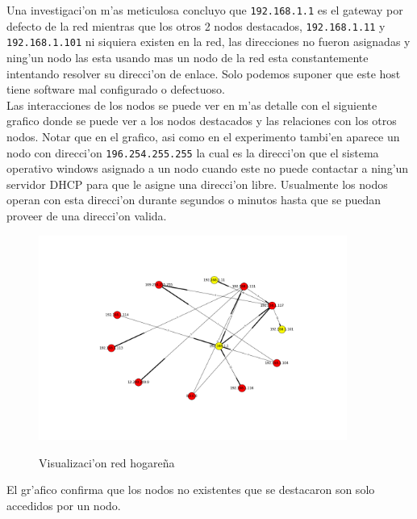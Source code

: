 Una investigaci'on m'as meticulosa concluyo que \texttt{192.168.1.1} es el gateway por defecto de la red mientras que los otros 2 nodos
destacados, \texttt{192.168.1.11} y \texttt{192.168.1.101} ni siquiera existen en la red, las direcciones no fueron asignadas y ning'un
nodo las esta usando mas un nodo de la red esta constantemente intentando resolver su direcci'on de enlace. Solo podemos
suponer que este host tiene software mal configurado o defectuoso.\\

Las interacciones de los nodos se puede ver en m'as detalle con el siguiente grafico donde se puede ver a los nodos destacados
y las relaciones con los otros nodos. Notar que en el grafico, asi como en el experimento tambi'en aparece un nodo con direcci'on 
\texttt{196.254.255.255} la cual es la direcci'on que el sistema operativo windows asignado a un nodo cuando este no puede
contactar a ning'un servidor DHCP para que le asigne una direcci'on libre. Usualmente los nodos operan con esta direcci'on durante
segundos o minutos hasta que se puedan proveer de una direcci'on valida.\\

\begin{figure}[!h]
\centering
\caption{Visualizaci'on red hogare\~na}
\includegraphics[width=0.9\textwidth]{red1_red}
 \label{fig:red1net}
\end{figure}

El gr'afico confirma que los nodos no existentes que se destacaron son solo accedidos por un nodo.
